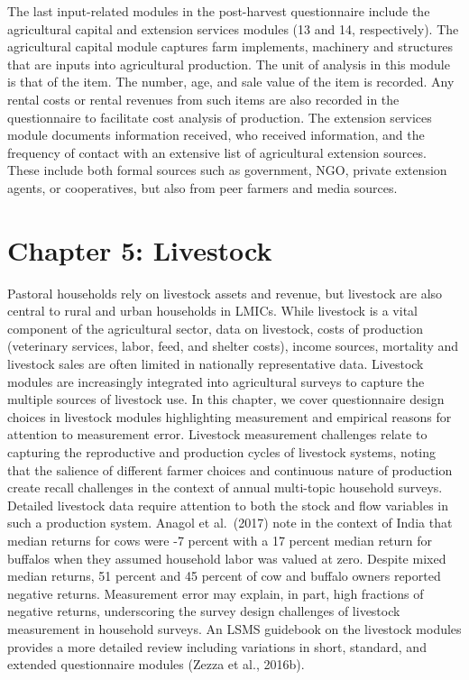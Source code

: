 \documentclass[
]{book}
\begin{document}
The last input-related modules in the post-harvest questionnaire include the agricultural capital and extension services modules (13 and 14, respectively). The agricultural capital module captures farm implements, machinery and structures that are inputs into agricultural production. The unit of analysis in this module is that of the item. The number, age, and sale value of the item is recorded. Any rental costs or rental revenues from such items are also recorded in the questionnaire to facilitate cost analysis of production. The extension services module documents information received, who received information, and the frequency of contact with an extensive list of agricultural extension sources. These include both formal sources such as government, NGO, private extension agents, or cooperatives, but also from peer farmers and media sources.

\hypertarget{chapter-5-livestock}{%
\chapter{Chapter 5: Livestock}\label{chapter-5-livestock}}

Pastoral households rely on livestock assets and revenue, but livestock are also central to rural and urban households in LMICs. While livestock is a vital component of the agricultural sector, data on livestock, costs of production (veterinary services, labor, feed, and shelter costs), income sources, mortality and livestock sales are often limited in nationally representative data. Livestock modules are increasingly integrated into agricultural surveys to capture the multiple sources of livestock use. In this chapter, we cover questionnaire design choices in livestock modules highlighting measurement and empirical reasons for attention to measurement error. Livestock measurement challenges relate to capturing the reproductive and production cycles of livestock systems, noting that the salience of different farmer choices and continuous nature of production create recall challenges in the context of annual multi-topic household surveys. Detailed livestock data require attention to both the stock and flow variables in such a production system. Anagol et al.~(2017) note in the context of India that median returns for cows were -7 percent with a 17 percent median return for buffalos when they assumed household labor was valued at zero. Despite mixed median returns, 51 percent and 45 percent of cow and buffalo owners reported negative returns. Measurement error may explain, in part, high fractions of negative returns, underscoring the survey design challenges of livestock measurement in household surveys. An LSMS guidebook on the livestock modules provides a more detailed review including variations in short, standard, and extended questionnaire modules (Zezza et al., 2016b).
\end{document}
